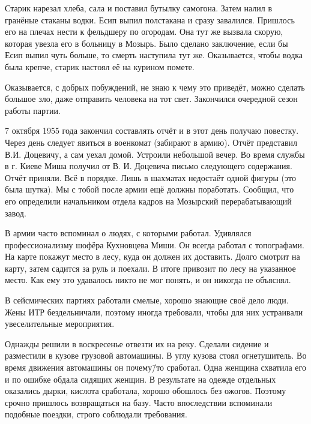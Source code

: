 Старик нарезал хлеба, сала и поставил бутылку самогона. Затем налил в гранёные стаканы водки. Есип выпил полстакана и сразу завалился. Пришлось его на плечах нести к фельдшеру по огородам. Она тут же вызвала скорую, которая увезла его в больницу в Мозырь. Было сделано заключение, если бы Есип выпил чуть больше, то смерть наступила тут же. Оказывается, чтобы водка была крепче, старик настоял её на курином помете.

Оказывается, с добрых побуждений, не знаю к чему это приведёт, можно сделать большое зло, даже отправить человека на тот свет. Закончился очередной сезон работы партии.

7 октября 1955 года закончил составлять отчёт и в этот день получаю повестку. Через день следует явиться в военкомат (забирают в армию). Отчёт представил В.И. Доцевичу, а сам уехал домой. Устроили небольшой вечер. Во время службы в г. Киеве Миша получил от В. И. Доцевича письмо следующего содержания. Отчёт приняли. Всё в порядке. Лишь в шахматах недостаёт одной фигуры (это была шутка). Мы с тобой после армии ещё должны поработать. Сообщил, что его определили начальником отдела кадров на Мозырский перерабатывающий завод.

В армии часто вспоминал о людях, с которыми работал. Удивлялся профессионализму шофёра Кухновцева Миши. Он всегда работал с топографами. На карте покажут место в лесу, куда он должен их доставить. Долго смотрит на карту, затем садится за руль и поехали. В итоге привозит по лесу на указанное место. Как ему это удавалось никто не мог понять, и он никогда не объяснял.

В сейсмических партиях работали смелые, хорошо знающие своё дело люди. Жены ИТР бездельничали, поэтому иногда требовали, чтобы для них устраивали увеселительные мероприятия.

Однажды решили в воскресенье отвезти их на реку. Сделали сидение и разместили в кузове грузовой автомашины. В углу кузова стоял огнетушитель. Во время движения автомашины он почему\=/то сработал. Одна женщина схватила его и по ошибке обдала сидящих женщин. В результате на одежде отдельных оказались дырки, кислота сработала, хорошо обошлось без ожогов. Поэтому срочно пришлось возвращаться на базу. Часто впоследствии вспоминали подобные поездки, строго соблюдали требования.
